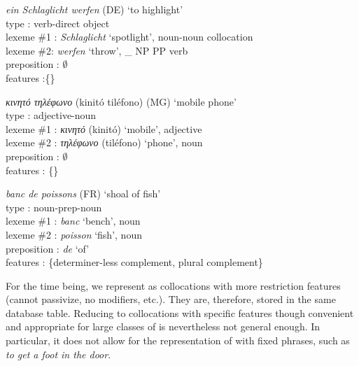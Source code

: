 \documentclass[output=paper]{langsci/langscibook}
\begin{document}
\begin{exe}
  \ex\label{fou:lex1}
           {\em ein Schlaglicht werfen } (DE) `to highlight' \\
           type : verb-direct object \\
           lexeme \#1 : {\em Schlaglicht} `spotlight', noun-noun collocation\\
           lexeme  \#2: {\em werfen} `throw', \_ NP PP verb\\
           preposition : $\emptyset$ \\
           features :\{\}
  



  \ex\label{fou:lex2}
           {\em  κινητό τηλέφωνο} (kinitó tiléfono) (MG) `mobile phone' \\
           type : adjective-noun \\
           lexeme  \#1 : {\em κινητό} (kinitó) `mobile', adjective\\
           lexeme  \#2 : {\em τηλέφωνο} (tiléfono) `phone', noun \\
           preposition : $\emptyset$ \\
           features : \{\}
  


  \ex\label{fou:lex3}
           {\em banc de poissons} (FR) `shoal of fish' \\
           type : noun-prep-noun \\
           lexeme  \#1 : {\em banc} `bench', noun \\
           lexeme  \#2 : {\em poisson} `fish', noun \\
           preposition :  {\em de} `of'\\
           features : \{determiner-less complement, plural complement\}
\end{exe}           


For the time being, we represent  as collocations with more restriction features (cannot passivize, no modifiers, etc.). They are, therefore, stored in the same database table. Reducing  to collocations with specific features though convenient and appropriate for large classes of  is nevertheless not general enough. In particular, it does not allow for the representation of  with fixed phrases, such as \textit{to get a foot in the door}. 
\end{document}

